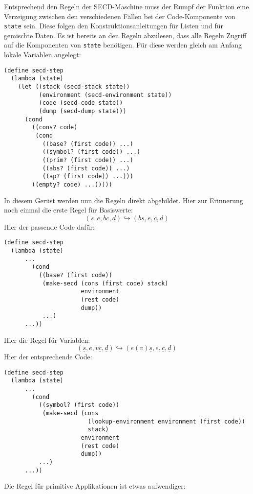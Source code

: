 %
Entsprechend den Regeln der SECD-Maschine muss der Rumpf der Funktion
eine Verzeigung zwischen den verschiedenen Fällen bei der
Code-Komponente von \texttt{state} sein.  Diese folgen den
Konstruktionsanleitungen für Listen und für gemischte Daten.  Es ist
bereits an den Regeln abzulesen, dass alle Regeln Zugriff auf die
Komponenten von \texttt{state} benötigen.  Für diese werden gleich am
Anfang lokale Variablen angelegt:
%
\begin{verbatim}
(define secd-step
  (lambda (state)
    (let ((stack (secd-stack state))
          (environment (secd-environment state))
          (code (secd-code state))
          (dump (secd-dump state)))
      (cond
        ((cons? code)
         (cond
           ((base? (first code)) ...)
           ((symbol? (first code)) ...)
           ((prim? (first code)) ...)
           ((abs? (first code)) ...)
           ((ap? (first code)) ...)))
        ((empty? code) ...)))))
\end{verbatim}
%
In diesem Gerüst werden nun die Regeln direkt abgebildet.  Hier zur
Erinnerung noch einmal die erste Regel für Basiswerte:
%
\begin{displaymath}
  (\underline{s}, e, b\underline{c}, \underline{d})
  \hookrightarrow
  (b\underline{s}, e, \underline{c}, \underline{d})
\end{displaymath}
%
Hier der passende Code dafür:
%
\begin{verbatim}
(define secd-step
  (lambda (state)
      ...
        (cond
          ((base? (first code))
           (make-secd (cons (first code) stack)
                      environment
                      (rest code)
                      dump))
           ...)
      ...))
\end{verbatim}
%
Hier die Regel für Variablen:
\begin{displaymath}
  (\underline{s}, e, v\underline{c}, \underline{d})
  \hookrightarrow
  (e(v)\underline{s}, e, \underline{c}, \underline{d})
\end{displaymath}
%
Hier der entsprechende Code:
%
\begin{verbatim}
(define secd-step
  (lambda (state)
      ...
        (cond
          ((symbol? (first code))
           (make-secd (cons
                        (lookup-environment environment (first code))
                        stack)
                      environment
                      (rest code)
                      dump))
          ...)
      ...))
\end{verbatim}
%
Die Regel für primitive Applikationen ist etwas aufwendiger:
